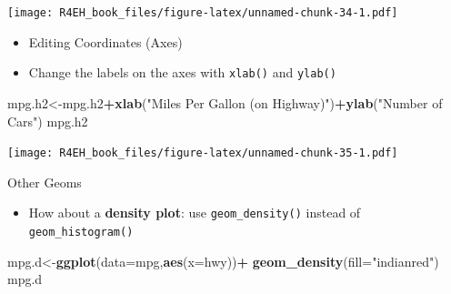 \documentclass[]{book}
\newenvironment{Shaded}{\begin{snugshade}}{\end{snugshade}}
\newcommand{\KeywordTok}[1]{\textcolor[rgb]{0.13,0.29,0.53}{\textbf{#1}}}
\newcommand{\DataTypeTok}[1]{\textcolor[rgb]{0.13,0.29,0.53}{#1}}
\newcommand{\DecValTok}[1]{\textcolor[rgb]{0.00,0.00,0.81}{#1}}
\newcommand{\StringTok}[1]{\textcolor[rgb]{0.31,0.60,0.02}{#1}}
\newcommand{\OperatorTok}[1]{\textcolor[rgb]{0.81,0.36,0.00}{\textbf{#1}}}
\newcommand{\NormalTok}[1]{#1}
\providecommand{\tightlist}{%
  \setlength{\itemsep}{0pt}\setlength{\parskip}{0pt}}
\theoremstyle{definition}
\theoremstyle{definition}
\theoremstyle{definition}
\theoremstyle{remark}
\begin{document}
\begin{Shaded}
\end{Shaded}

\texttt{[image: R4EH\_book\_files/figure-latex/unnamed-chunk-34-1.pdf]}

\begin{itemize}
\item
  Editing Coordinates (Axes)
\item
  Change the labels on the axes with \texttt{xlab()} and \texttt{ylab()}
\end{itemize}

\begin{Shaded}
\begin{Highlighting}[]
\NormalTok{mpg.h2<-mpg.h2}\OperatorTok{+}\KeywordTok{xlab}\NormalTok{(}\StringTok{"Miles Per Gallon (on Highway)"}\NormalTok{)}\OperatorTok{+}\KeywordTok{ylab}\NormalTok{(}\StringTok{"Number of Cars"}\NormalTok{)}
\NormalTok{mpg.h2}
\end{Highlighting}
\end{Shaded}

\texttt{[image: R4EH\_book\_files/figure-latex/unnamed-chunk-35-1.pdf]}

Other Geoms

\begin{itemize}
\tightlist
\item
  How about a \textbf{density plot}: use \texttt{geom\_density()}
  instead of \texttt{geom\_histogram()}
\end{itemize}

\begin{Shaded}
\begin{Highlighting}[]
\NormalTok{mpg.d<-}\KeywordTok{ggplot}\NormalTok{(}\DataTypeTok{data=}\NormalTok{mpg,}\KeywordTok{aes}\NormalTok{(}\DataTypeTok{x=}\NormalTok{hwy))}\OperatorTok{+}
\StringTok{  }\KeywordTok{geom_density}\NormalTok{(}\DataTypeTok{fill=}\StringTok{"indianred"}\NormalTok{)}
\NormalTok{mpg.d}
\end{Highlighting}
\end{Shaded}
\end{document}
